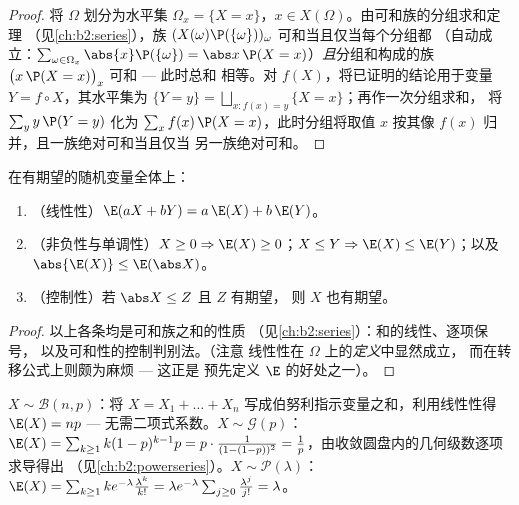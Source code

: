 \begin{proof}
将 $\Omega$ 划分为水平集 $\Omega_x = \{X = x\}$，$x
\in X(\Omega)$。由可和族的分组求和定理
（见\cref{ch:b2:series}），族
$(X(\omega)\P(\{\omega\}))_\omega$ 可和当且仅当每个分组都
（自动成立：$\sum_{\omega \in \Omega_x}\abs{x}\P(\{\omega\}) =
\abs x\,\P(X = x)$）\emph{且}分组和构成的族
$\bigl(x\,\P(X = x)\bigr)_x$ 可和 --- 此时总和
相等。对 $f(X)$，将已证明的结论用于变量 $Y =
f \circ X$，其水平集为 $\{Y = y\} =
\bigsqcup_{x : f(x) = y}\{X = x\}$；再作一次分组求和，
将 $\sum_y y\,\P(Y = y)$ 化为 $\sum_x
f(x)\,\P(X = x)$，此时分组将取值 $x$
按其像 $f(x)$ 归并，且一族绝对可和当且仅当
另一族绝对可和。
\end{proof}

\begin{theorem}[期望的性质]\label{thm:b2:randomvar:linearity}
在有期望的随机变量全体上：
\begin{enumerate}
\item （线性性）$\E(aX + bY) = a\,\E(X) + b\,\E(Y)$。
\item （非负性与单调性）$X \geq 0 \Rightarrow \E(X)
\geq 0$；$X \leq Y \Rightarrow \E(X) \leq \E(Y)$；以及
$\abs{\E(X)} \leq \E(\abs X)$。
\item （控制性）若 $\abs X \leq Z$ 且 $Z$ 有期望，
则 $X$ 也有期望。
\end{enumerate}
\end{theorem}

\begin{proof}
以上各条均是可和族之和的性质
（见\cref{ch:b2:series}）：和的线性、逐项保号，
以及可和性的控制判别法。（注意
线性性在 $\Omega$ 上的\emph{定义}中显然成立，
而在转移公式上则颇为麻烦 --- 这正是
预先定义 $\E$ 的好处之一）。
\end{proof}

\begin{example}\label{ex:b2:randomvar:expectations}
$X \sim \mathcal{B}(n, p)$：将 $X = X_1 + \dots + X_n$
写成伯努利指示变量之和，利用线性性得 $\E(X) = np$ ---
无需二项式系数。$X \sim \mathcal{G}(p)$：$\E(X) =
\sum_{k\geq1}k(1-p)^{k-1}p = p\cdot\frac{1}{(1 - (1-p))^2} =
\frac1p$，由收敛圆盘内的几何级数逐项求导得出
（见\cref{ch:b2:powerseries}）。$X \sim \mathcal{P}(\lambda)$：$\E(X)
= \sum_{k\geq1}k e^{-\lambda}\frac{\lambda^k}{k!} = \lambda
e^{-\lambda}\sum_{j\geq0}\frac{\lambda^j}{j!} = \lambda$。
\end{example}

